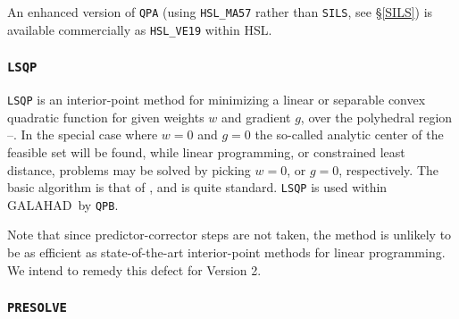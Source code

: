 \documentclass[twoside]{article}
\newcommand{\gal}{{\sf GALAHAD}}
\newcommand{\ltsubsubsection}[1]{\subsubsection{{\tt #1}} \label{#1}}
\begin{document}
An enhanced version of {\tt QPA} (using {\tt HSL\_MA57} rather than {\tt SILS},
see \S\ref{SILS}) is available commercially as {\tt HSL\_VE19} within HSL.

\ltsubsubsection{LSQP}

{\tt LSQP} is an interior-point method for minimizing a linear or
separable convex quadratic function
for given weights $w$ and gradient $g$,
over the polyhedral region --.
In the special case where $w = 0$ and $g = 0$
the so-called analytic center of the feasible set will be found,
while linear programming, or constrained least distance, problems
may be solved by picking $w = 0$, or $g = 0$, respectively.
The basic algorithm is that of , and is quite standard.
{\tt LSQP} is used within \gal\ by {\tt QPB}.

Note that since predictor-corrector steps are not taken, the method
is unlikely to be as efficient as state-of-the-art interior-point
methods for linear programming. We intend to remedy this defect for
Version 2.

\ltsubsubsection{PRESOLVE}
\end{document}
